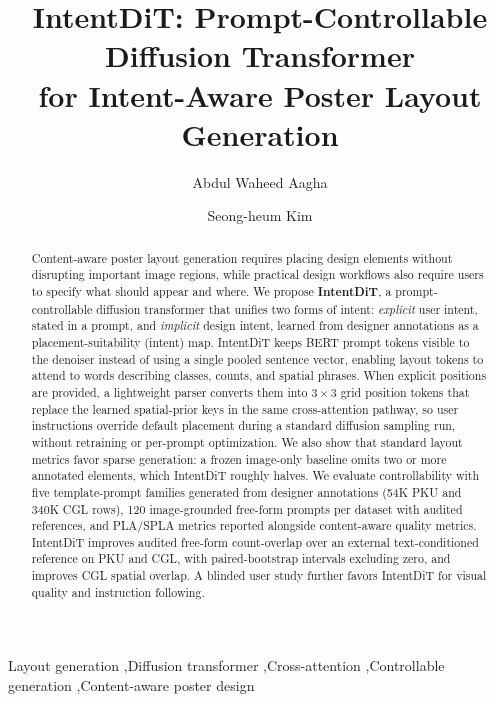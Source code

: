 \documentclass[review]{elsarticle}
\begin{document}
\begin{frontmatter}

\title{IntentDiT: Prompt-Controllable Diffusion Transformer \\ for Intent-Aware Poster Layout Generation}

\author[mymainaddress]{Abdul Waheed Aagha}
\author[mymainaddress]{Seong-heum Kim}
\address[mymainaddress]{School of AI Convergence, College of Information Technology, Soongsil University, Seoul, South Korea}

\begin{abstract}
Content-aware poster layout generation requires placing design elements without disrupting important image regions, while practical design workflows also require users to specify what should appear and where.
We propose \textbf{IntentDiT}, a prompt-controllable diffusion transformer that unifies two forms of intent: \emph{explicit} user intent, stated in a prompt, and \emph{implicit} design intent, learned from designer annotations as a placement-suitability (intent) map.
IntentDiT keeps BERT prompt tokens visible to the denoiser instead of using a single pooled sentence vector, enabling layout tokens to attend to words describing classes, counts, and spatial phrases.
When explicit positions are provided, a lightweight parser converts them into $3{\times}3$ grid position tokens that replace the learned spatial-prior keys in the same cross-attention pathway, so user instructions
override default placement during a standard diffusion sampling run, without retraining or per-prompt optimization.
We also show that standard layout metrics favor sparse generation: a frozen image-only baseline omits two or more annotated elements, which IntentDiT roughly halves.
We evaluate controllability with five template-prompt families generated from designer annotations (54K PKU and 340K CGL rows), 120 image-grounded free-form prompts per dataset with audited references, and PLA/SPLA metrics reported alongside content-aware quality metrics. IntentDiT improves audited free-form count-overlap over an external text-conditioned reference on PKU and CGL, with paired-bootstrap intervals excluding zero, and improves CGL spatial overlap.
A blinded user study further favors IntentDiT for visual quality and instruction following.

\end{abstract}

\begin{keyword}
Layout generation \sep Diffusion transformer \sep Cross-attention \sep Controllable generation \sep Content-aware poster design
\end{keyword}

\end{frontmatter}
\linenumbers
\end{document}
